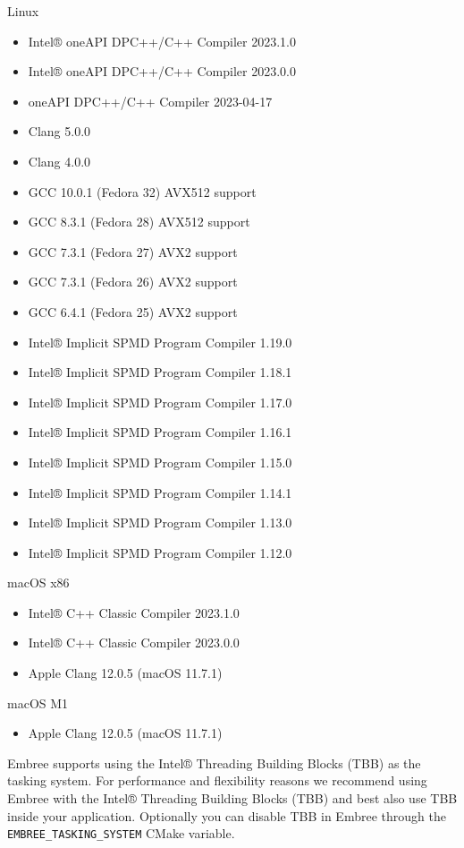 Linux

\begin{itemize}
\tightlist
\item
  Intel® oneAPI DPC++/C++ Compiler 2023.1.0
\item
  Intel® oneAPI DPC++/C++ Compiler 2023.0.0
\item
  oneAPI DPC++/C++ Compiler 2023-04-17
\item
  Clang 5.0.0
\item
  Clang 4.0.0
\item
  GCC 10.0.1 (Fedora 32) AVX512 support
\item
  GCC 8.3.1 (Fedora 28) AVX512 support
\item
  GCC 7.3.1 (Fedora 27) AVX2 support
\item
  GCC 7.3.1 (Fedora 26) AVX2 support
\item
  GCC 6.4.1 (Fedora 25) AVX2 support
\item
  Intel® Implicit SPMD Program Compiler 1.19.0
\item
  Intel® Implicit SPMD Program Compiler 1.18.1
\item
  Intel® Implicit SPMD Program Compiler 1.17.0
\item
  Intel® Implicit SPMD Program Compiler 1.16.1
\item
  Intel® Implicit SPMD Program Compiler 1.15.0
\item
  Intel® Implicit SPMD Program Compiler 1.14.1
\item
  Intel® Implicit SPMD Program Compiler 1.13.0
\item
  Intel® Implicit SPMD Program Compiler 1.12.0
\end{itemize}

macOS x86

\begin{itemize}
\tightlist
\item
  Intel® C++ Classic Compiler 2023.1.0
\item
  Intel® C++ Classic Compiler 2023.0.0
\item
  Apple Clang 12.0.5 (macOS 11.7.1)
\end{itemize}

macOS M1

\begin{itemize}
\tightlist
\item
  Apple Clang 12.0.5 (macOS 11.7.1)
\end{itemize}

Embree supports using the Intel® Threading Building Blocks (TBB) as the
tasking system. For performance and flexibility reasons we recommend
using Embree with the Intel® Threading Building Blocks (TBB) and best
also use TBB inside your application. Optionally you can disable TBB in
Embree through the \texttt{EMBREE\_TASKING\_SYSTEM} CMake variable.

